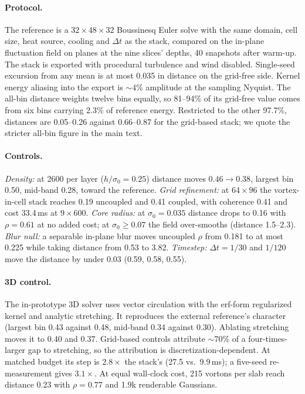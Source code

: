 \documentclass[acmtog,nonacm]{acmart}
\newcommand{\sigz}{\sigma_0}
\begin{document}
\paragraph{Protocol.} The reference is a $32\times48\times32$ Boussinesq Euler solve with the same domain, cell size, heat source, cooling and $\Delta t$ as the stack, compared on the in-plane fluctuation field on planes at the nine slices' depths, 40 snapshots after warm-up. The stack is exported with procedural turbulence and wind disabled. Single-seed excursion from any mean is at most 0.035 in distance on the grid-free side. Kernel energy aliasing into the export is $\sim$4\% amplitude at the sampling Nyquist. The all-bin distance weights twelve bins equally, so 81--94\% of its grid-free value comes from six bins carrying 2.3\% of reference energy. Restricted to the other 97.7\%, distances are 0.05--0.26 against 0.66--0.87 for the grid-based stack; we quote the stricter all-bin figure in the main text.

\paragraph{Controls.} \emph{Density:} at 2600 per layer ($h/\sigz=0.25$) distance moves $0.46\to0.38$, largest bin 0.50, mid-band 0.28, toward the reference. \emph{Grid refinement:} at $64\times96$ the vortex-in-cell stack reaches 0.19 uncoupled and 0.41 coupled, with coherence 0.41 and cost 33.4\,ms at $9\times600$. \emph{Core radius:} at $\sigz=0.035$ distance drops to 0.16 with $\rho=0.61$ at no added cost; at $\sigz\geq0.07$ the field over-smooths (distance 1.5--2.3). \emph{Blur null:} a separable in-plane blur moves uncoupled $\rho$ from 0.181 to at most 0.225 while taking distance from 0.53 to 3.82. \emph{Timestep:} $\Delta t=1/30$ and $1/120$ move the distance by under 0.03 (0.59, 0.58, 0.55).

\paragraph{3D control.} The in-prototype 3D solver uses vector circulation with the erf-form regularized kernel \cite{winckelmans1993} and analytic stretching. It reproduces the external reference's character (largest bin 0.43 against 0.48, mid-band 0.34 against 0.30). Ablating stretching moves it to 0.40 and 0.37. Grid-based controls attribute $\sim$70\% of a four-times-larger gap to stretching, so the attribution is discretization-dependent. At matched budget its step is $2.8\times$ the stack's (27.5 vs.\ 9.9\,ms); a five-seed re-measurement gives $3.1\times$. At equal wall-clock cost, 215 vortons per slab reach distance 0.23 with $\rho=0.77$ and 1.9k renderable Gaussians.
\end{document}
